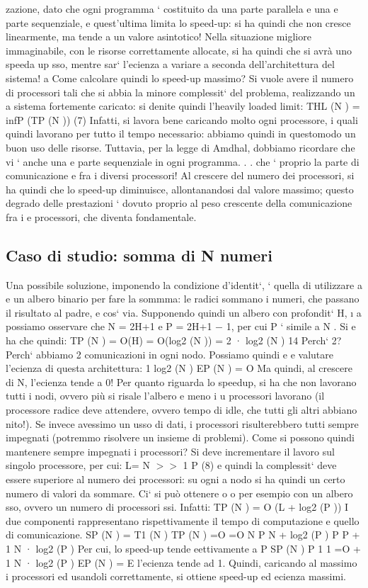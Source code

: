 \documentclass[a4paper,12pt]{article}
\begin{document}
zazione, dato che ogni programma ` costituito da una parte parallela e una
e
parte sequenziale, e quest'ultima limita lo speed-up: si ha quindi che non cresce
linearmente, ma tende a un valore asintotico! Nella situazione migliore immaginabile, con le risorse correttamente
allocate, si ha quindi che si avrà uno speeda
up sso, mentre sar` l'ecienza a variare a seconda dell'architettura del sistema!
a
Come calcolare quindi lo speed-up massimo? Si vuole avere il numero di
processori tali che si abbia la minore complessit` del problema, realizzando un
a
sistema fortemente caricato: si denite quindi l'heavily loaded limit:
THL (N ) = infP (TP (N ))
(7)
Infatti, si lavora bene caricando molto ogni processore, i quali quindi lavorano
per tutto il tempo necessario: abbiamo quindi in questomodo un buon uso delle
risorse.
Tuttavia, per la legge di Amdhal, dobbiamo ricordare che vi ` anche una
e
parte sequenziale in ogni programma. . . che ` proprio la parte di comunicazione
e
fra i diversi processori! Al crescere del numero dei processori, si ha quindi
che lo speed-up diminuisce, allontanandosi dal valore massimo; questo degrado
delle prestazioni ` dovuto proprio al peso crescente della comunicazione fra i
e
processori, che diventa fondamentale.
\subsection{Caso di studio: somma di N numeri}
Una possibile soluzione, imponendo la condizione d'identit`, ` quella di utilizzare
a e
un albero binario per fare la sommma: le radici sommano i numeri, che passano
il risultato al padre, e cos` via. Supponendo quindi un albero con profondit` H,
\i{}
a
possiamo osservare che N = 2H+1 e P = 2H+1 $-$ 1, per cui P ` simile a N . Si
e
ha che quindi:
TP (N ) = O(H)
= O(log2 (N ))
= 2 · log2 (N )
14
Perch` 2? Perch` abbiamo 2 comunicazioni in ogni nodo. Possiamo quindi
e
e
valutare l'ecienza di questa architettura:
1
log2 (N )
EP (N ) = O
Ma quindi, al crescere di N, l'ecienza tende a 0! Per quanto riguarda lo speedup, si ha che non lavorano tutti i nodi,
ovvero più si risale l'albero e meno i
u
processori lavorano (il processore radice deve attendere, ovvero tempo di idle,
che tutti gli altri abbiano nito!). Se invece avessimo un usso di dati, i processori risulterebbero tutti sempre
impegnati (potremmo risolvere un insieme di
problemi).
Come si possono quindi mantenere sempre impegnati i processori? Si deve
incrementare il lavoro sul singolo processore, per cui:
L=
N
$>$$>$ 1
P
(8)
e quindi la complessit` deve essere superiore al numero dei processori: su ogni
a
nodo si ha quindi un certo numero di valori da sommare. Ci` si può ottenere
o
o
per esempio con un albero sso, ovvero un numero di processori ssi. Infatti:
TP (N ) = O (L + log2 (P ))
I due componenti rappresentano rispettivamente il tempo di computazione e
quello di comunicazione.
SP (N ) =
T1 (N )
TP (N )
=O
=O
N
P
N
+ log2 (P )
P
P
+
1
N · log2 (P )
Per cui, lo speed-up tende eettivamente a P
SP (N )
P
1
1
=O
+
1 N · log2 (P )
EP (N ) =
E l'ecienza tende ad 1. Quindi, caricando al massimo i processori ed usandoli
correttamente, si ottiene speed-up ed ecienza massimi.
\end{document}
